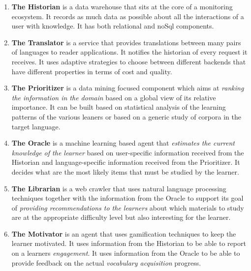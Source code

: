 \newcommand {\archiblock}[1]{\item {\bf #1}}
\begin{enumerate}
	
		\archiblock{The Historian} is a data warehouse that sits at the core of a monitoring ecosystem. It records as much data as possible about all the interactions of a user with knowledge. 
		It has both relational and noSql components.

		\archiblock{The Translator} is a service that provides translations between many pairs of languages to reader applications. It notifies the historian of every request it receives. 
		It uses adaptive strategies to choose between different backends that have different properties in terms of cost and quality.

		\archiblock{The Prioritizer} is a data mining focused component which aims at {\em ranking the information in the domain} based on a global view of its relative importance. It can be built based on statistical analysis of the learning patterns of the various leaners or based on a generic study of corpora in the target language.

		\archiblock{The Oracle} is a machine learning based agent that {\em estimates the current knowledge of the learner} based on user-specific information received from the Historian and language-specific information received from the Prioritizer. It decides what are the most likely items that must be studied by the learner. 

		\archiblock {The Librarian} is a web crawler that uses natural language processing techniques together with the information from the Oracle to support its goal of {\em providing recommendations to the learners} about which materials to study are at the appropriate difficulty level but also interesting for the learner.

		\archiblock {The Motivator} is an agent that uses gamification techniques to keep the learner motivated. It uses information from the Historian to be able to report on a learners {\em engagement}. It uses information from the Oracle to be able to provide feedback on the actual {\em vocabulary acquisition } progress. 

\end{enumerate}





